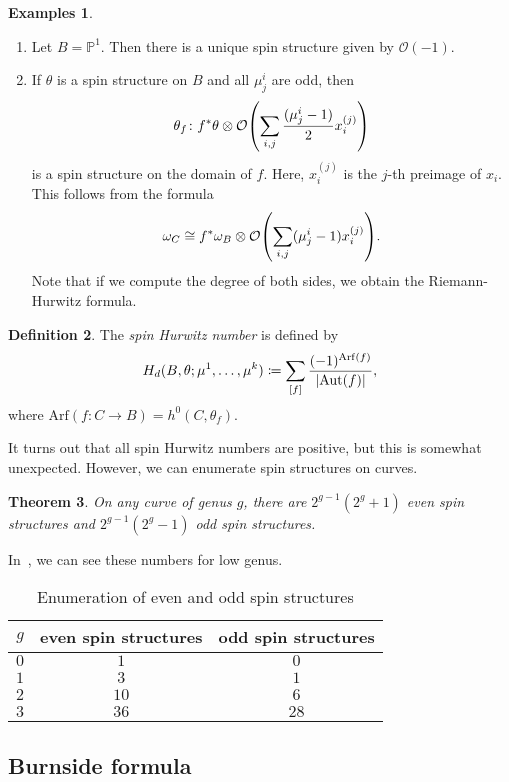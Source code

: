 \documentclass[leqno, openany]{memoir}
\newtheorem{thm}{Theorem}[section]
\theoremstyle{definition}
\newtheorem{defn}[thm]{Definition}
\newtheorem{exms}[thm]{Examples}
\theoremstyle{remark}
\theoremstyle{plain}
\theoremstyle{definition}
\theoremstyle{remark}
\renewcommand{\P}{\mathbb{P}}
\newcommand{\mc}[1]{\mathcal{#1}}
\newcommand{\mr}[1]{\mathrm{#1}}
\DeclareMathOperator{\Aut}{Aut}
\begin{document}
\begin{exms}\leavevmode
\begin{enumerate}
\item Let $B = \P^1$. Then there is a unique spin structure given by $\mc{O}(-1)$.
\item If $\theta$ is a spin structure on $B$ and all $\mu_j^i$ are odd, then
  \[ \theta_f \colon f^* \theta \otimes \mc{O}\qty(\sum_{i,j} \frac{(\mu_j^i-1)}{2} x_i^{(j)}) \]
  is a spin structure on the domain of $f$. Here, $x_i^{(j)}$ is the $j$-th preimage of $x_i$. This follows from the formula
  \[ \omega_C \cong f^* \omega_B \otimes \mc{O}\qty(\sum_{i,j} (\mu_j^i-1) x_i^{(j)}). \]
  Note that if we compute the degree of both sides, we obtain the Riemann-Hurwitz formula.
\end{enumerate}
\end{exms}

\begin{defn}
  The \textit{spin Hurwitz number} is defined by
  \[ H_d(B, \theta; \mu^1, \ldots, \mu^k) \coloneqq \sum_{[f]} \frac{(-1)^{\mr{Arf}(f)}}{\abs{\Aut(f)}}, \]
  where $\mr{Arf}(f \colon C \to B) = h^0(C, \theta_f)$.
\end{defn}

It turns out that all spin Hurwitz numbers are positive, but this is somewhat unexpected. However, we can enumerate spin structures on curves.
\begin{thm}
On any curve of genus $g$, there are $2^{g-1}(2^g+1)$ even spin structures and $2^{g-1} (2^g-1)$ odd spin structures.
\end{thm}
In~, we can see these numbers for low genus.
\begin{table}[htpb]
  \centering
  \caption{Enumeration of even and odd spin structures}
  \label{tab:even_odd}
  \begin{tabular}{ccc}
    \toprule
    $g$ & even spin structures & odd spin structures \\
    \midrule
    $0$ & $1$ & $0$ \\
    $1$ & $3$ & $1$ \\
    $2$ & $10$ & $6$ \\
    $3$ & $36$ & $28$ \\
    \bottomrule
  \end{tabular}
\end{table}

\subsection{Burnside formula}
\label{subsec:burnside}
\end{document}
